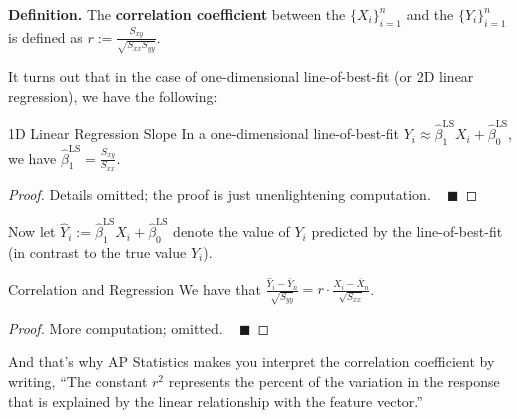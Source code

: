 \textbf{Definition.}
The \textbf{correlation coefficient}
between the $\{X_i\}_{i = 1}^n$ and the $\{Y_i\}_{i = 1}^n$
is defined as $r := \frac{S_{xy}}{\sqrt{S_{xx}S_{yy}}}$.

It turns out that in the case of
one-dimensional line-of-best-fit (or 2D linear regression),
we have the following:

\begin{theorem}{1D Linear Regression Slope}
    In a one-dimensional line-of-best-fit
    $Y_i \approx \hat{\beta}^{\mathrm{LS}}_1X_i + \hat{\beta}^{\mathrm{LS}}_0$,
    we have $\hat{\beta}^{\mathrm{LS}}_1 = \frac{S_{xy}}{S_{xx}}$.
\end{theorem}

\begin{proof}
    Details omitted; the proof is just unenlightening computation.
    ~ $\blacksquare$
\end{proof}

Now let $\hat{Y}_i :=
\hat{\beta}^{\mathrm{LS}}_1X_i + \hat{\beta}^{\mathrm{LS}}_0$
denote the value of $Y_i$ predicted by the line-of-best-fit
(in contrast to the true value $Y_i$).

\begin{theorem}{Correlation and Regression}
    We have that
    $\frac{\hat{Y}_i - \bar{Y}_n}{\sqrt{S_{yy}}}
    = r \cdot \frac{X_i - \bar{X}_n}{\sqrt{S_{xx}}}$.
\end{theorem}

\begin{proof}
    More computation; omitted. ~ $\blacksquare$
\end{proof}

And that's why AP Statistics makes you
interpret the correlation coefficient by writing,
``The constant $r^2$ represents
the percent of the variation in the response
that is explained by the linear relationship with
the feature vector.''

